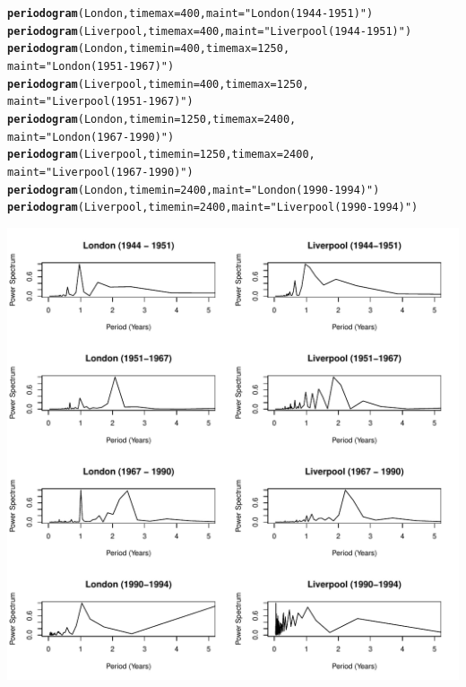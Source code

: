 \documentclass[12pt]{article}\usepackage[]{graphicx}\usepackage[]{color}
\makeatletter
\def\maxwidth{ %
  \ifdim\Gin@nat@width>\linewidth
    \linewidth
  \else
    \Gin@nat@width
  \fi
}
\newcommand{\hlnum}[1]{\textcolor[rgb]{0.686,0.059,0.569}{#1}}%
\newcommand{\hlstr}[1]{\textcolor[rgb]{0.192,0.494,0.8}{#1}}%
\newcommand{\hlstd}[1]{\textcolor[rgb]{0.345,0.345,0.345}{#1}}%
\newcommand{\hlkwc}[1]{\textcolor[rgb]{0.333,0.667,0.333}{#1}}%
\newcommand{\hlkwd}[1]{\textcolor[rgb]{0.737,0.353,0.396}{\textbf{#1}}}%
\newenvironment{kframe}{%
 \def\at@end@of@kframe{}%
 \ifinner\ifhmode%
  \def\at@end@of@kframe{\end{minipage}}%
  \begin{minipage}{\columnwidth}%
 \fi\fi%
 \def\FrameCommand##1{\hskip\@totalleftmargin \hskip-\fboxsep
 \colorbox{shadecolor}{##1}\hskip-\fboxsep
     \hskip-\linewidth \hskip-\@totalleftmargin \hskip\columnwidth}%
 \MakeFramed {\advance\hsize-\width
   \@totalleftmargin\z@ \linewidth\hsize
   \@setminipage}}%
 {\par\unskip\endMakeFramed%
 \at@end@of@kframe}
\newenvironment{knitrout}{}{} %
\makeatother
\begin{document}
\begin{enumerate}[(a)]
\begin{knitrout}
\begin{kframe}
\begin{alltt}
\hlkwd{periodogram}\hlstd{(London,} \hlkwc{timemax} \hlstd{=} \hlnum{400}\hlstd{,} \hlkwc{maint} \hlstd{=} \hlstr{"London (1944 - 1951)"}\hlstd{)}
\hlkwd{periodogram}\hlstd{(Liverpool,} \hlkwc{timemax} \hlstd{=} \hlnum{400}\hlstd{,} \hlkwc{maint} \hlstd{=} \hlstr{"Liverpool (1944-1951)"}\hlstd{)}
\hlkwd{periodogram}\hlstd{(London,} \hlkwc{timemin} \hlstd{=} \hlnum{400}\hlstd{,} \hlkwc{timemax} \hlstd{=} \hlnum{1250}\hlstd{,}
            \hlkwc{maint} \hlstd{=} \hlstr{"London (1951-1967)"}\hlstd{)}
\hlkwd{periodogram}\hlstd{(Liverpool,} \hlkwc{timemin} \hlstd{=} \hlnum{400}\hlstd{,} \hlkwc{timemax} \hlstd{=} \hlnum{1250}\hlstd{,}
            \hlkwc{maint} \hlstd{=} \hlstr{"Liverpool (1951-1967)"}\hlstd{)}
\hlkwd{periodogram}\hlstd{(London,} \hlkwc{timemin} \hlstd{=} \hlnum{1250}\hlstd{,} \hlkwc{timemax} \hlstd{=} \hlnum{2400}\hlstd{,}
            \hlkwc{maint} \hlstd{=} \hlstr{"London (1967 - 1990)"}\hlstd{)}
\hlkwd{periodogram}\hlstd{(Liverpool,} \hlkwc{timemin} \hlstd{=} \hlnum{1250}\hlstd{,} \hlkwc{timemax} \hlstd{=} \hlnum{2400}\hlstd{,}
            \hlkwc{maint} \hlstd{=} \hlstr{"Liverpool (1967 - 1990)"}\hlstd{)}
\hlkwd{periodogram}\hlstd{(London,} \hlkwc{timemin} \hlstd{=} \hlnum{2400}\hlstd{,} \hlkwc{maint} \hlstd{=} \hlstr{"London (1990-1994)"}\hlstd{)}
\hlkwd{periodogram}\hlstd{(Liverpool,} \hlkwc{timemin} \hlstd{=} \hlnum{2400}\hlstd{,} \hlkwc{maint} \hlstd{=} \hlstr{"Liverpool (1990-1994)"}\hlstd{)}
\end{alltt}
\end{kframe}
\includegraphics[width=\maxwidth]{figure/unnamed-chunk-4-1} 


\end{knitrout}
\end{enumerate}
\end{document}
